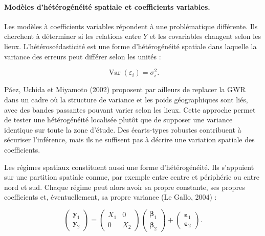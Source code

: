 \documentclass[11pt,a4paper]{article}
\begin{document}
\paragraph{Modèles d'hétérogénéité spatiale et coefficients variables.}

Les modèles à coefficients variables répondent à une problématique différente. Ils cherchent à déterminer si les relations entre $Y$ et les covariables changent selon les lieux. L'hétéroscédasticité est une forme d'hétérogénéité spatiale dans laquelle la variance des erreurs peut différer selon les unités :

\begin{equation}
    \operatorname{Var}(\varepsilon_i)=\sigma_i^2.
\end{equation}

Páez, Uchida et Miyamoto (2002) proposent par ailleurs de replacer la GWR dans un cadre où la structure de variance et les poids géographiques sont liés, avec des bandes passantes pouvant varier selon les lieux. Cette approche permet de tester une hétérogénéité localisée plutôt que de supposer une variance identique sur toute la zone d'étude. Des écarts-types robustes contribuent à sécuriser l'inférence, mais ils ne suffisent pas à décrire une variation spatiale des coefficients.

Les régimes spatiaux constituent aussi une forme d'hétérogénéité. Ils s'appuient sur une partition spatiale connue, par exemple entre centre et périphérie ou entre nord et sud. Chaque régime peut alors avoir sa propre constante, ses propres coefficients et, éventuellement, sa propre variance (Le Gallo, 2004) :

\begin{equation}
    \begin{pmatrix}
        \mathbf{y}_1 \\
        \mathbf{y}_2
    \end{pmatrix}
    =
    \begin{pmatrix}
        X_1 & 0 \\
        0 & X_2
    \end{pmatrix}
    \begin{pmatrix}
        \boldsymbol{\beta}_1 \\
        \boldsymbol{\beta}_2
    \end{pmatrix}
    +
    \begin{pmatrix}
        \boldsymbol{\varepsilon}_1 \\
        \boldsymbol{\varepsilon}_2
    \end{pmatrix}.
\end{equation}
\end{document}
